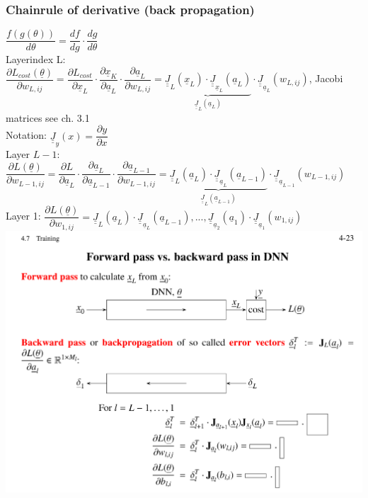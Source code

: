 \subsubsection{Chainrule of derivative (back propagation)} 
$\dfrac{ f(g(\theta))}{d \theta} = \dfrac{df}{dg} \cdot \dfrac{dg}{d \theta} $ \\
Layerindex L: $  \dfrac{\partial L_{cost}(\underline{\theta})}{\partial w_{L,ij}} = \dfrac{\partial L_{cost} }{\partial \underline{x}_{L}} \cdot \dfrac{\partial \underline{x}_K}{\partial \underline{a}_L} \cdot \dfrac{\partial \underline{a}_L }{\partial w_{L,ij}} = \underbrace{ \underline{\underline{J}}_L (\underline{x}_L) \cdot \underline{\underline{J}}_{\underline{x}_L}(\underline{a}_L)}_{\underline{\underline{J}}_L (\underline{a}_L)} \cdot \underline{\underline{J}}_{\underline{a}_L} (w_{L,ij}) $, Jacobi matrices see ch. 3.1\\
Notation: $ \underline{\underline{J}}_y (x ) = \dfrac{\partial y}{\partial x}  $ \\
Layer $ L-1$:\\
$ \dfrac{\partial L (\underline{\theta})}{\partial w _{L-1, ij}} = \dfrac{\partial L}{\partial \underline{a}_L} \cdot \dfrac{\partial \underline{a}_L}{\partial \underline{a}_{L-1}} \cdot \dfrac{\partial  \underline{a}_{L-1}}{\partial w_{L-1,ij}} = \underbrace{ \underline{\underline{J}}_L (\underline{a}_L) \cdot \underline{\underline{J}}_{\underline{a}_L} (\underline{a}_{L-1})}_{\underline{\underline{J}}_L(\underline{a}_{L-1})} \cdot \underline{\underline{J}}_{\underline{a}_{L-1}}(w_{L-1,ij}) $ \\
Layer 1: $ \dfrac{\partial L (\underline{\theta})}{\partial w_{1,ij}} = \underline{\underline{J}}_L ( \underline{a}_L) \cdot \underline{\underline{J}}_{\underline{a}_L}(\underline{a}_{L-1}) , ..., \underline{\underline{J}}_{\underline{a}_2}(\underline{a}_1) \cdot \underline{\underline{J}}_{\underline{a}_1} (w_{1,ij}) $ \\
\includegraphics[width = \linewidth]{Images/Training423.png}\\
